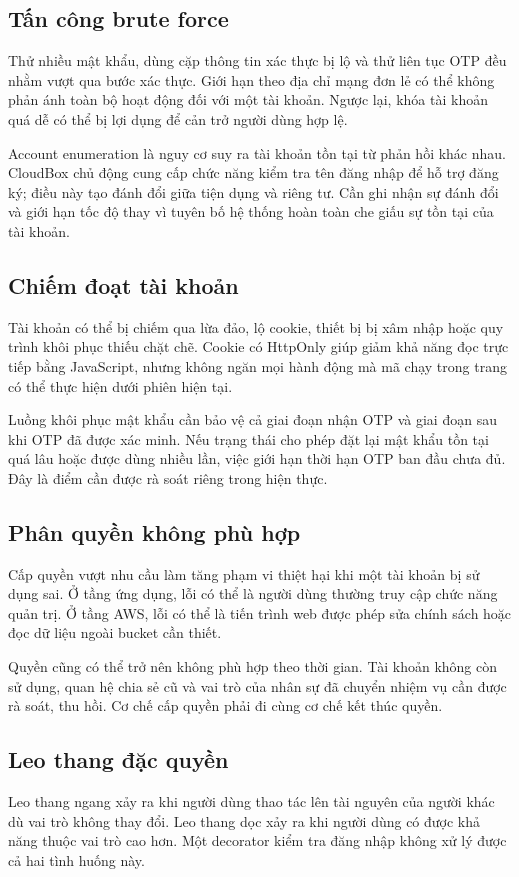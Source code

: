 \subsection{Tấn công brute force}
Thử nhiều mật khẩu, dùng cặp thông tin xác thực bị lộ và thử liên tục OTP đều nhằm vượt qua bước xác thực. Giới hạn theo địa chỉ mạng đơn lẻ có thể không phản ánh toàn bộ hoạt động đối với một tài khoản. Ngược lại, khóa tài khoản quá dễ có thể bị lợi dụng để cản trở người dùng hợp lệ.

Account enumeration là nguy cơ suy ra tài khoản tồn tại từ phản hồi khác nhau. CloudBox chủ động cung cấp chức năng kiểm tra tên đăng nhập để hỗ trợ đăng ký; điều này tạo đánh đổi giữa tiện dụng và riêng tư. Cần ghi nhận sự đánh đổi và giới hạn tốc độ thay vì tuyên bố hệ thống hoàn toàn che giấu sự tồn tại của tài khoản.
\subsection{Chiếm đoạt tài khoản}
Tài khoản có thể bị chiếm qua lừa đảo, lộ cookie, thiết bị bị xâm nhập hoặc quy trình khôi phục thiếu chặt chẽ. Cookie có HttpOnly giúp giảm khả năng đọc trực tiếp bằng JavaScript, nhưng không ngăn mọi hành động mà mã chạy trong trang có thể thực hiện dưới phiên hiện tại.

Luồng khôi phục mật khẩu cần bảo vệ cả giai đoạn nhận OTP và giai đoạn sau khi OTP đã được xác minh. Nếu trạng thái cho phép đặt lại mật khẩu tồn tại quá lâu hoặc được dùng nhiều lần, việc giới hạn thời hạn OTP ban đầu chưa đủ. Đây là điểm cần được rà soát riêng trong hiện thực.
\subsection{Phân quyền không phù hợp}
Cấp quyền vượt nhu cầu làm tăng phạm vi thiệt hại khi một tài khoản bị sử dụng sai. Ở tầng ứng dụng, lỗi có thể là người dùng thường truy cập chức năng quản trị. Ở tầng AWS, lỗi có thể là tiến trình web được phép sửa chính sách hoặc đọc dữ liệu ngoài bucket cần thiết.

Quyền cũng có thể trở nên không phù hợp theo thời gian. Tài khoản không còn sử dụng, quan hệ chia sẻ cũ và vai trò của nhân sự đã chuyển nhiệm vụ cần được rà soát, thu hồi. Cơ chế cấp quyền phải đi cùng cơ chế kết thúc quyền.
\subsection{Leo thang đặc quyền}
Leo thang ngang xảy ra khi người dùng thao tác lên tài nguyên của người khác dù vai trò không thay đổi. Leo thang dọc xảy ra khi người dùng có được khả năng thuộc vai trò cao hơn. Một decorator kiểm tra đăng nhập không xử lý được cả hai tình huống này.

